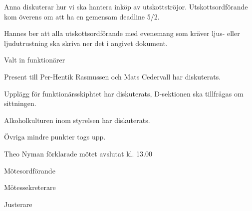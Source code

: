 \documentclass[10pt]{article}
\def\mo{Theo Nyman}
\def\ms{Hannes Björk}
\def\ji{Sophia Carlsson}
\begin{document}
\begin{paragrafer}
Anna diskuterar hur vi ska hantera inköp av utskottströjor.
Utskottsordförande kom överens om att ha en gemensam deadline 5/2.

Hannes ber att alla utskottsordförande med evenemang som kräver ljus- eller ljudutrustning ska skriva ner det i angivet dokument.


Valt in funktionärer

Present till Per-Hentik Rasmussen och Mats Cedervall har diskuterats.

Upplägg för funktionärsskiphtet har diskuterats, D-sektionen ska tillfrågas om sittningen.

Alkoholkulturen inom styrelsen har diskuterats.

Övriga mindre punkter togs upp.

{\mo} förklarade mötet avslutat kl. 13.00
\end{paragrafer}

\hidesignfoot
\begin{signatures}{3}
\signature{\mo}{Mötesordförande}
\signature{\ms}{Mötessekreterare}
\signature{\ji}{Justerare}
\end{signatures}
\end{document}

